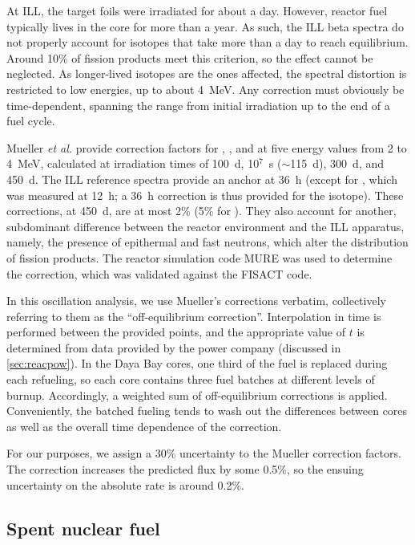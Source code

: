\documentclass[../thesis.tex]{subfiles}
\begin{document}
At ILL, the target foils were irradiated for about a day. However, reactor fuel typically lives in the core for more than a year. As such, the ILL beta spectra do not properly account for isotopes that take more than a day to reach equilibrium. Around 10\% of fission products meet this criterion, so the effect cannot be neglected. As longer-lived isotopes are the ones affected, the spectral distortion is restricted to low energies, up to about 4~MeV. Any correction must obviously be time-dependent, spanning the range from initial irradiation up to the end of a fuel cycle.

Mueller \emph{et al.} provide correction factors for \urfive, \punine, and \puone at five energy values from 2 to 4~MeV, calculated at irradiation times of 100~d, 10$^7$~s ($\sim$115~d), 300~d, and 450~d. The ILL reference spectra provide an anchor at 36~h (except for \urfive, which was measured at 12~h; a 36~h correction is thus provided for the isotope). These corrections, at 450~d, are at most 2\% (5\% for \urfive). They also account for another, subdominant difference between the reactor environment and the ILL apparatus, namely, the presence of epithermal and fast neutrons, which alter the distribution of fission products. The reactor simulation code MURE was used to determine the correction, which was validated against the FISACT code.

In this oscillation analysis, we use Mueller's corrections verbatim, collectively referring to them as the ``off-equilibrium correction''. Interpolation in time is performed between the provided points, and the appropriate value of $t$ is determined from data provided by the power company (discussed in \autoref{sec:reacpow}). In the Daya Bay cores, one third of the fuel is replaced during each refueling, so each core contains three fuel batches at different levels of burnup. Accordingly, a weighted sum of off-equilibrium corrections is applied. Conveniently, the batched fueling tends to wash out the differences between cores as well as the overall time dependence of the correction.

For our purposes, we assign a 30\% uncertainty to the Mueller correction factors. The correction increases the predicted flux by some 0.5\%, so the ensuing uncertainty on the absolute rate is around 0.2\%.

\subsection{Spent nuclear fuel}
\label{sec:snfcorr}
\end{document}

